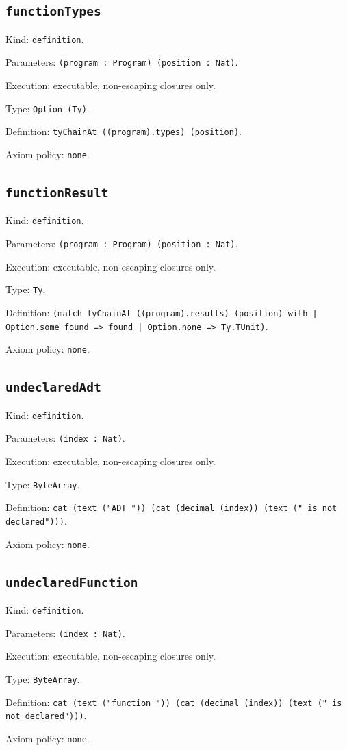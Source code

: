 \documentclass[11pt]{article}
\begin{document}
\subsection*{\texttt{functionTypes}}
\noindent Kind: \texttt{definition}.\par
\noindent Parameters: \texttt{(program : Program) (position : Nat)}.\par
\noindent Execution: executable, non-escaping closures only.\par
\noindent Type: \texttt{Option (Ty)}.\par
\noindent Definition: \texttt{tyChainAt ((program).types) (position)}.\par
\noindent Axiom policy: \texttt{none}.\par
\subsection*{\texttt{functionResult}}
\noindent Kind: \texttt{definition}.\par
\noindent Parameters: \texttt{(program : Program) (position : Nat)}.\par
\noindent Execution: executable, non-escaping closures only.\par
\noindent Type: \texttt{Ty}.\par
\noindent Definition: \texttt{(match tyChainAt ((program).results) (position) with | Option.some found => found | Option.none => Ty.TUnit)}.\par
\noindent Axiom policy: \texttt{none}.\par
\subsection*{\texttt{undeclaredAdt}}
\noindent Kind: \texttt{definition}.\par
\noindent Parameters: \texttt{(index : Nat)}.\par
\noindent Execution: executable, non-escaping closures only.\par
\noindent Type: \texttt{ByteArray}.\par
\noindent Definition: \texttt{cat (text ("ADT ")) (cat (decimal (index)) (text (" is not declared")))}.\par
\noindent Axiom policy: \texttt{none}.\par
\subsection*{\texttt{undeclaredFunction}}
\noindent Kind: \texttt{definition}.\par
\noindent Parameters: \texttt{(index : Nat)}.\par
\noindent Execution: executable, non-escaping closures only.\par
\noindent Type: \texttt{ByteArray}.\par
\noindent Definition: \texttt{cat (text ("function ")) (cat (decimal (index)) (text (" is not declared")))}.\par
\noindent Axiom policy: \texttt{none}.\par
\end{document}
